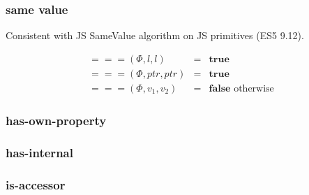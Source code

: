 \documentclass[draft, 10pt]{article}
\newcommand{\lit}[0]{l}
\newcommand{\true}[0]{\textbf{true}}
\newcommand{\false}[0]{\textbf{false}}
\newcommand{\opsamevalue}[0]{===}
\newcommand{\heap}[0]{\Phi}
\newcommand{\bigval}[0]{v}
\newcommand{\heapptr}{ptr}
\newcommand{\runbinop}[4]{#1(#2,#3,#4)}
\begin{document}
\subsubsection{same value}

Consistent with JS SameValue algorithm on JS primitives (ES5 9.12).

\[
\begin{array}{rcl}
\runbinop{\opsamevalue}{\heap}{\lit}{\lit} &=& \true \\
\runbinop{\opsamevalue}{\heap}{\heapptr}{\heapptr} &=& \true \\
\runbinop{\opsamevalue}{\heap}{\bigval_1}{\bigval_2} &=& \false \textrm{ otherwise} 
\end{array}
\]

\subsubsection{has-own-property}

\subsubsection{has-internal}

\subsubsection{is-accessor}

\[
\begin{array}{rcl}
\end{array}
\]
\end{document}
